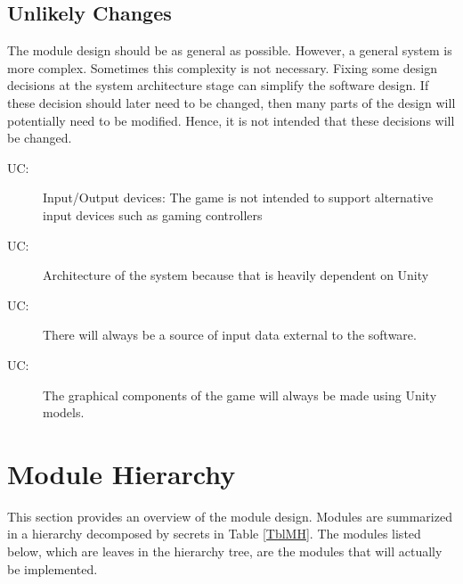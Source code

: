 \documentclass[12pt, titlepage]{article}
\newcounter{ucnum}
\newcommand{\uctheucnum}{UC\theucnum}
\begin{document}
\subsection{Unlikely Changes} \label{SecUchange}

The module design should be as general as possible. However, a general system is
more complex. Sometimes this complexity is not necessary. Fixing some design
decisions at the system architecture stage can simplify the software design. If
these decision should later need to be changed, then many parts of the design
will potentially need to be modified. Hence, it is not intended that these
decisions will be changed.

\begin{description}
\item[ \uctheucnum \label{ucIO}:] Input/Output devices: The game is not intended to support alternative input devices such as gaming controllers
\item[ \uctheucnum \label{ucInput}:] Architecture of the system because that is heavily dependent on Unity
\item[ \uctheucnum \label{uc3}:] There will always be a source of input data external to the software.
\item[ \uctheucnum \label{uc4}:] The graphical components of the game will always be made using Unity models.
\end{description}

\newpage
\section{Module Hierarchy} \label{SecMH}

This section provides an overview of the module design. Modules are summarized
in a hierarchy decomposed by secrets in Table \ref{TblMH}. The modules listed
below, which are leaves in the hierarchy tree, are the modules that will
actually be implemented.
\end{document}
